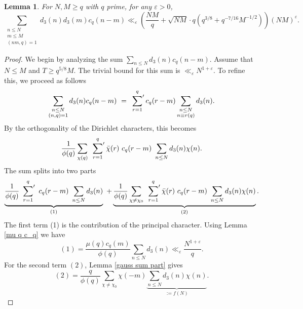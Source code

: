 \documentclass[oneside,reqno,10pt]{amsart}
\numberwithin{equation}{section}
\theoremstyle{plain}
\newtheorem{lemma}{Lemma}
\theoremstyle{definition}
\numberwithin{equation}{section}
\begin{document}
\begin{lemma}\label{lemma6}
For $N,M \geq q$ with $q$ prime, for any $\varepsilon>0$,
\begin{equation*}
    \sum_{\substack{n\leq N\\ m\leq M\\ (nm,q)=1}} d_3(n) d_3(m) c_q(n-m) \ll_{\varepsilon}\left( \frac{NM}{q}+ \sqrt{NM}\cdot q\left(q^{3/8}+q^{-7/16}M^{-1/2}\right)\right)(NM)^\varepsilon.
\end{equation*}
\end{lemma}
\begin{proof}
We begin by analyzing the sum $\sum\limits_{n\leq N} d_3(n) c_q(n-m)$. Assume that $N\leq M$ and  $T\geq q^{5/8} M$. The trivial bound for this sum is $\ll_{\varepsilon} N^{1+\varepsilon}$. To refine this, we proceed as follows
    \begin{equation*}
        \sum_{\substack{n\leq N\\ (n,q)=1}} d_3(n) c_q(n-m)\ =\ \sideset{}{'}\sum_{r=1}^q c_q(r-m) \sum_{\substack{n\leq N\\ n\equiv r(q)}} d_3(n).
    \end{equation*}
    By the orthogonality of the Dirichlet characters, this becomes
    \begin{equation*}
        \frac{1}{\phi(q)} \sum_{\chi  (q)}\  \sideset{}{'}\sum_{r=1}^q \bar{\chi}(r)\ c_q(r-m)\ \sum_{n\leq N} d_3(n) \chi(n).
    \end{equation*}    
    The sum splits into two parts
    \begin{equation}\label{main lemma first step}
         \underbrace{\frac{1}{\phi(q)} \  \sideset{}{'}\sum_{r=1}^q \ c_q(r-m) \ \sum_{n\leq N} d_3(n)}_{ (1)} \ + \underbrace{\frac{1}{\phi(q)} \sum_{\chi\neq \chi_0}\  \sideset{}{'}\sum_{r=1}^q \bar{\chi}(r)\ c_q(r-m)\ \sum_{n\leq N} d_3(n) \chi(n)}_{(2)}.   
    \end{equation}
The first term (1) is the contribution of the principal character. Using Lemma \ref{mu q c_q} we have
\begin{equation}\label{main lemma eqn (1)}
    (1) = \frac{\mu(q)c_q(m)}{\phi(q)} \sum_{n\leq N} d_3(n) \ll_{\varepsilon} \frac{N^{1+\varepsilon}}{q}.
\end{equation}
For the second term $(2)$, Lemma \ref{gauss sum part} gives
\begin{equation}\label{main lemma eqn (2)}
    (2)= \frac{q}{\phi(q)}\sum_{\chi \neq \chi_0} \chi(-m) \underbrace{\sum_{n\leq N} d_3(n) \chi(n)}_{:=f(N)}.

\end{equation}
\end{proof}
\end{document}
